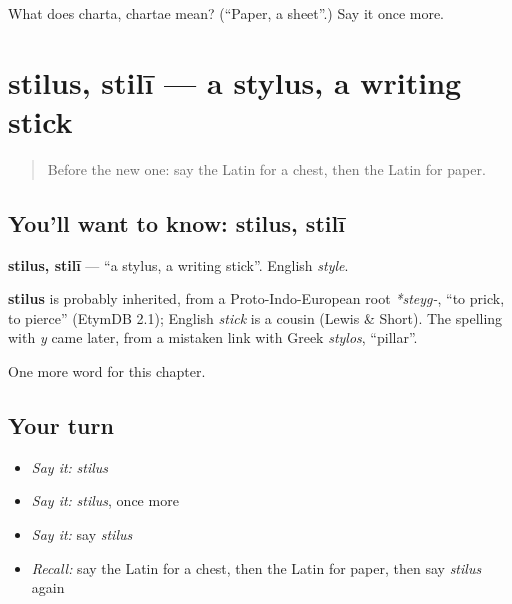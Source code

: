 \begin{tcolorbox}[breakable,colback=teal!4,colframe=teal!35!black,title={Before you move on}]
What does charta, chartae mean? (\textquotedblleft{}Paper, a sheet\textquotedblright{}.) Say it once more.
\end{tcolorbox}
\section[stilus, stilī]{stilus, stilī — a stylus, a writing stick}

\label{lesson:LA-C84-stilus}



\begin{quote}
Before the new one: say the Latin for a chest, then the Latin for paper.
\end{quote}

\subsection*{You'll want to know: stilus, stilī}
\textbf{stilus, stilī} — \textquotedblleft{}a stylus, a writing stick\textquotedblright{}. English \emph{style}.

\begin{cousinweb}
\textbf{stilus} is probably inherited, from a Proto-Indo-European root \emph{*steyg-}, \textquotedblleft{}to prick, to pierce\textquotedblright{} (EtymDB 2.1); English \emph{stick} is a cousin (Lewis \& Short). The spelling with \emph{y} came later, from a mistaken link with Greek \emph{stylos}, \textquotedblleft{}pillar\textquotedblright{}.
\end{cousinweb}

\begin{grammarlens}[title={What you've built}]
One more word for this chapter.
\end{grammarlens}

\subsection*{Your turn}
\begin{itemize}
\raggedright
  \item \emph{Say it:} \emph{stilus}
  \item \emph{Say it:} \emph{stilus}, once more
  \item \emph{Say it:} say \emph{stilus}
  \item \emph{Recall:} say the Latin for a chest, then the Latin for paper, then say \emph{stilus} again
\end{itemize}

